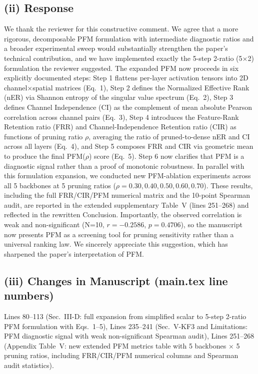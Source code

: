 \documentclass[conference]{IEEEtran}
\begin{document}
\subsection*{(ii) Response}
We thank the reviewer for this constructive comment. We agree that a more rigorous, decomposable PFM formulation with intermediate diagnostic ratios and a broader experimental sweep would substantially strengthen the paper's technical contribution, and we have implemented exactly the 5-step 2-ratio (5$\times$2) formulation the reviewer suggested. The expanded PFM now proceeds in six explicitly documented steps: Step 1 flattens per-layer activation tensors into 2D channel$\times$spatial matrices (Eq.~1), Step 2 defines the Normalized Effective Rank (nER) via Shannon entropy of the singular value spectrum (Eq.~2), Step 3 defines Channel Independence (CI) as the complement of mean absolute Pearson correlation across channel pairs (Eq.~3), Step 4 introduces the Feature-Rank Retention ratio (FRR) and Channel-Independence Retention ratio (CIR) as functions of pruning ratio $\rho$, averaging the ratio of pruned-to-dense nER and CI across all layers (Eq.~4), and Step 5 composes FRR and CIR via geometric mean to produce the final PFM($\rho$) score (Eq.~5). Step 6 now clarifies that PFM is a diagnostic signal rather than a proof of monotonic robustness. In parallel with this formulation expansion, we conducted new PFM-ablation experiments across all 5 backbones at 5 pruning ratios ($\rho = 0.30, 0.40, 0.50, 0.60, 0.70$). These results, including the full FRR/CIR/PFM numerical matrix and the 10-point Spearman audit, are reported in the extended supplementary Table~V (lines 251--268) and reflected in the rewritten Conclusion. Importantly, the observed correlation is weak and non-significant (N=10, $r=-0.2586$, $p=0.4706$), so the manuscript now presents PFM as a screening tool for pruning sensitivity rather than a universal ranking law. We sincerely appreciate this suggestion, which has sharpened the paper's interpretation of PFM.

\subsection*{(iii) Changes in Manuscript (main.tex line numbers)}
Lines 80--113 (Sec.~III-D: full expansion from simplified scalar to 5-step 2-ratio PFM formulation with Eqs.~1--5), Lines 235--241 (Sec.~V-KF3 and Limitations: PFM diagnostic signal with weak non-significant Spearman audit), Lines 251--268 (Appendix Table~V: new extended PFM metrics table with 5 backbones $\times$ 5 pruning ratios, including FRR/CIR/PFM numerical columns and Spearman audit statistics).
\end{document}
